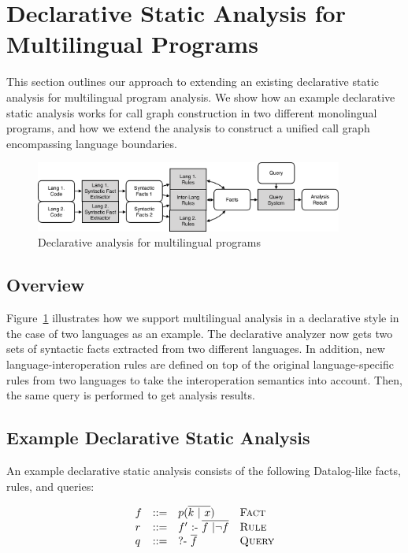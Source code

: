 
\section{Declarative Static Analysis for Multilingual Programs}
This section outlines our approach to extending an existing declarative static
analysis for multilingual program analysis.  We show how an example declarative
static analysis works for call graph construction in two different monolingual
programs, and how we extend the analysis to construct a unified call graph
encompassing language boundaries.

\begin{figure}[t]
  \centering
  \vspace{2mm}
  \includegraphics[width=0.9\textwidth]{img/ov2.pdf}
  \caption{Declarative analysis for multilingual programs}
  \label{fig:ov2}
\end{figure}

\subsection{Overview}
Figure~\ref{fig:ov2} illustrates how we support multilingual analysis in a
declarative style in the case of two languages as an example. The declarative
analyzer now gets two sets of syntactic facts extracted from two different
languages. In addition, new language-interoperation rules are defined on top of
the original language-specific rules from two languages to take the
interoperation semantics into account. Then, the same query is performed to get
analysis results.

\subsection{Example Declarative Static Analysis}
An example declarative static analysis consists of the following Datalog-like facts, rules,
and queries:

\[
  \begin{array}{llll}
    f & ::= & p(\overline{k\ |\ x}) & \text{\sc Fact}\\
    r & ::= & f'\ \mbox{:-}\ \overline{f\ |\neg f} & \text{\sc Rule}\\
    q & ::= & \mbox{?-}\ \overline{f}\ &  \text{\sc Query}
\end{array}
\]

